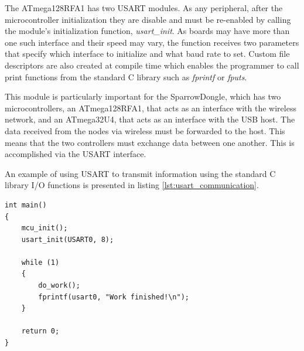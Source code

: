 The \mbox{ATmega128RFA1} has two USART modules. As any peripheral, after the
microcontroller initialization they are disable and must be re-enabled by
calling the module's initialization function, \emph{usart\_init}. As boards may
have more than one such interface and their speed may vary, the function
receives two parameters that specify which interface to initialize and what
baud rate to set. Custom file descriptors are also created at compile time
which enables the programmer to call print functions from the standard C
library such as \emph{fprintf} or \emph{fputs}.

This module is particularly important for the SparrowDongle, which has two
microcontrollers, an \mbox{ATmega128RFA1}, that acts as an interface with the
wireless network, and an \mbox{ATmega32U4}, that acts as an interface with the
USB host. The data received from the nodes via wireless must be forwarded to
the host. This means that the two controllers must exchange data between one
another. This is accomplished via the USART interface.

An example of using USART to transmit information using the standard C library
I/O functions is presented in listing \ref{lst:usart_communication}.

\lstset{
	language=C, numbers=none, caption=USART communication snippet,
	label=lst:usart_communication
}
\begin{lstlisting}
int main()
{
	mcu_init();
	usart_init(USART0, 8);

	while (1)
	{
		do_work();
		fprintf(usart0, "Work finished!\n");
	}

	return 0;
}
\end{lstlisting}

